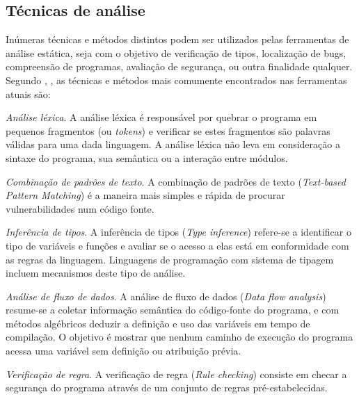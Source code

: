 \subsection{Técnicas de análise} \label{tecnicas}

Inúmeras técnicas e métodos distintos podem ser utilizados pelas ferramentas
de análise estática, seja com o objetivo de verificação de tipos, localização
de bugs, compreensão de programas, avaliação de segurança, ou outra finalidade
qualquer. Segundo , ,
 as técnicas e métodos mais comumente encontrados nas
ferramentas atuais são:

\begin{description}

  \item \textit{Análise léxica}.
    A análise léxica é responsável por quebrar o programa em pequenos fragmentos
    (ou {\it tokens}) e verificar se estes fragmentos são palavras válidas
    para uma dada linguagem. A análise léxica não leva em consideração a
    sintaxe do programa, sua semântica ou a interação entre módulos.

  \item \textit{Combinação de padrões de texto}.
    A combinação de padrões de texto ({\it Text-based Pattern Matching}) é a
    maneira mais simples e rápida de procurar vulnerabilidades num código
    fonte.

  \item \textit{Inferência de tipos}.
    A inferência de tipos ({\it Type inference}) refere-se a identificar o
    tipo de variáveis e funções e avaliar se o acesso a elas está em
    conformidade com as regras da linguagem. Linguagens de programação com
    sistema de tipagem incluem mecanismos deste tipo de análise.

  \item \textit{Análise de fluxo de dados}.
    A análise de fluxo de dados ({\it Data flow analysis}) resume-se a coletar
    informação semântica do código-fonte do programa, e com métodos algébricos
    deduzir a definição e uso das variáveis em tempo de compilação. O objetivo
    é mostrar que nenhum caminho de execução do programa acessa uma variável
    sem definição ou atribuição prévia.

  \item \textit{Verificação de regra}.
    A verificação de regra ({\it Rule checking}) consiste em checar a segurança
    do programa através de um conjunto de regras pré-estabelecidas.


\end{description}
